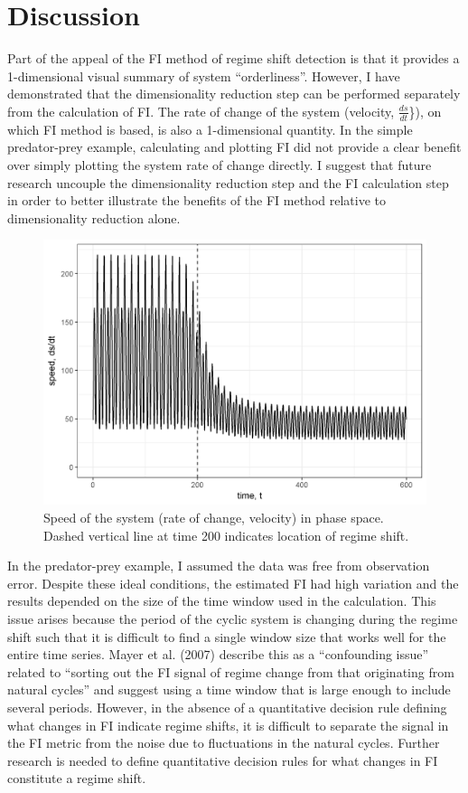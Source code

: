 \documentclass[12pt,twoside,openany]{reedthesis}
\begin{document}
\hypertarget{discussion-1}{%
\section{Discussion}\label{discussion-1}}

Part of the appeal of the FI method of regime shift detection is that it provides a 1-dimensional visual summary of system ``orderliness''. However, I have demonstrated that the dimensionality reduction step can be performed separately from the calculation of FI. The rate of change of the system (velocity, \(\frac{ds}{dt}\)\}), on which FI method is based, is also a 1-dimensional quantity. In the simple predator-prey example, calculating and plotting FI did not provide a clear benefit over simply plotting the system rate of change directly. I suggest that future research uncouple the dimensionality reduction step and the FI calculation step in order to better illustrate the benefits of the FI method relative to dimensionality reduction alone.
\begin{figure}
\includegraphics[width=0.95\linewidth]{./chapterFiles/fiGuide/figures/dsdtOverTime} \caption{Speed of the system (rate of change, velocity) in phase space. Dashed vertical line at time 200 indicates location of regime shift.}\label{fig:dsdtOverTime}
\end{figure}
In the predator-prey example, I assumed the data was free from observation error. Despite these ideal conditions, the estimated FI had high variation and the results depended on the size of the time window used in the calculation. This issue arises because the period of the cyclic system is changing during the regime shift such that it is difficult to find a single window size that works well for the entire time series. Mayer et al. (2007) describe this as a ``confounding issue'' related to ``sorting out the FI signal of regime change from that originating from natural cycles'' and suggest using a time window that is large enough to include several periods. However, in the absence of a quantitative decision rule defining what changes in FI indicate regime shifts, it is difficult to separate the signal in the FI metric from the noise due to fluctuations in the natural cycles. Further research is needed to define quantitative decision rules for what changes in FI constitute a regime shift.
\end{document}

